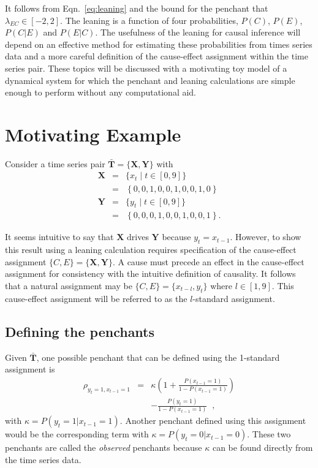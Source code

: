 \documentclass[a4paper,11pt,twocolumn]{article}
\begin{document}
It follows from Eqn.\ \ref{eq:leaning} and the bound for the penchant that $\lambda_{EC}\in\left[-2,2\right]$.  The leaning is a function of four probabilities, $P(C)$, $P(E)$, $P(C|E)$ and $P(E|C)$.  The usefulness of the leaning for causal inference will depend on an effective method for estimating these probabilities from times series data and a more careful definition of the cause-effect assignment within the time series pair.  These topics will be discussed with a motivating toy model of a dynamical system for which the penchant and leaning calculations are simple enough to perform without any computational aid.

\section{Motivating Example}
Consider a time series pair $\bar{\mathbf{T}}=\{\mathbf{X},\mathbf{Y}\}$ with
\begin{eqnarray*}
\mathbf{X} &=& \{x_t\; | \; t\in[0,9]\}\\
&=& \left\{0,0,1,0,0,1,0,0,1,0\right\}\\
\mathbf{Y} &=& \{y_t\; | \; t\in[0,9]\}\\
&=& \left\{0,0,0,1,0,0,1,0,0,1\right\}.
\end{eqnarray*}

It seems intuitive to say that $\mathbf{X}$ drives $\mathbf{Y}$ because $y_t=x_{t-1}$.  However, to show this result using a leaning calculation requires specification of the cause-effect assignment $\{C,E\}=\{\mathbf{X},\mathbf{Y}\}$.  A cause must precede an effect in the cause-effect assignment for consistency with the intuitive definition of causality.  It follows that a natural assignment may be $\{C,E\}=\{x_{t-l},y_t\}$ where $l\in[1,9]$.  This cause-effect assignment will be referred to as the $l$-standard assignment.

\subsection{Defining the penchants}
Given $\bar{\mathbf{T}}$, one possible penchant that can be defined using the 1-standard assignment is
\begin{eqnarray*}
\rho_{y_{t}=1,x_{t-1}=1} &=& \kappa \left(1+\frac{P\left(x_{t-1} = 1\right)}{1-P\left(x_{t-1} = 1\right)}\right)\\
& & -\frac{P\left(y_{t} = 1\right)}{1-P\left(x_{t-1} = 1\right)}\;\;,
\end{eqnarray*}
with $\kappa = P\left( y_t = 1 | x_{t-1} = 1\right)$.  Another penchant defined using this assignment would be the corresponding term with $\kappa = P\left( y_t = 0 | x_{t-1} = 0\right)$.  These two penchants are called the {\em observed} penchants because $\kappa$ can be found directly from the time series data.  
\end{document}

